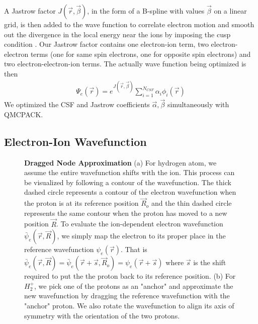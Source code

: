 \documentclass[aps,prl,superscriptaddress,groupedaddress]{revtex4}
\begin{document}
A Jastrow factor $J(\vec{r},\vec{\beta})$, in the form of a B-spline with values $\vec{\beta}$ on a linear grid, is then added to the wave function to correlate electron motion and smooth out the divergence in the local energy near the ions by imposing the cusp condition \cite{Kato}. Our Jastrow factor contains one electron-ion term, two electron-electron terms (one for same spin electrons, one for opposite spin electrons) and two electron-electron-ion terms. The actually wave function being optimized is then
\begin{align}
\Psi_e(\vec{r})=e^{J(\vec{r},\vec{\beta})}\sum\limits_{i=1}^{N_{CSF}}\alpha_i\phi_i(\vec{r})\label{eq:psie}
\end{align}
We optimized the CSF and Jastrow coefficients $\vec{\alpha},\vec{\beta}$ simultaneously with QMCPACK\cite{QMCPACK}.

\subsection{Electron-Ion Wavefunction}

\begin{figure*}[hpb]
\centering
{}
\subfloat[][$H_2^+$ molecule]{}
\caption{\textbf{Dragged Node Approximation} (a) For hydrogen atom, we assume the entire wavefunction shifts with the ion. This process can be visualized by following a contour of the wavefunction. The thick dashed circle represents a contour of the electron wavefunction when the proton is at its reference position $\vec{R}_o$ and the thin dashed circle represents the same contour when the proton has moved to a new position $\vec{R}$. To evaluate the ion-dependent electron wavefunction $\bar{\psi}_e(\vec{r},\vec{R})$, we simply map the electron to its proper place in the reference wavefunction $\psi_e(\vec{r})$. That is $\bar{\psi}_e(\vec{r},\vec{R})=\bar{\psi}_e(\vec{r}+\vec{s},\vec{R}_o)=\psi_e(\vec{r}+\vec{s})$ where $\vec{s}$ is the shift required to put the the proton back to its reference position. (b) For $H_2^+$, we pick one of the protons as an "anchor" and approximate the new wavefunction by dragging the reference wavefunction with the "anchor" proton. We also rotate the wavefunction to align its axis of symmetry with the orientation of the two protons. \label{fig:drag} }
\end{figure*}
\end{document}

